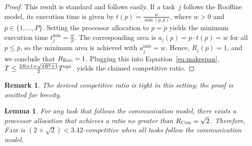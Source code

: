 \documentclass{article}
\newtheorem{lemma}{Lemma}
\newtheorem{remark}{Remark}
\newcommand\fair{\textsc{Fair}\xspace}
\newcommand\ratio{R\xspace}
\newcommand\opt{\textnormal{opt}\xspace}
\newcommand\ROO{\textsc{Roo}\xspace}
\newcommand\COM{\textsc{Com}\xspace}
\begin{document}
\begin{proof}
This result is standard and follows easily.  
If a task~$j$ follows the Roofline model, its execution time is given by $t(p) = \frac{w}{\min(p, \bar{p})}$, where $w > 0$ and $\bar{p} \in \{1, \dots, P\}$.  
Setting the processor allocation to $p = \bar{p}$ yields the minimum execution time $t_j^{\min} = \frac{w}{\bar{p}}$.  
The corresponding area is $a_j(p) = p \cdot t(p) = w$ for all $p \le \bar{p}$, so the minimum area is achieved with $a_j^{\min} = w$.  
Hence, $\ratio_j(p) = 1$, and we conclude that $\ratio_{\ROO} = 1$.  
Plugging this into Equation~\eqref{eq.makespan}, $T \leq \frac{2\ratio+1+
\sqrt{4\ratio^2+1}}{2} T^{\opt}$. yields the claimed competitive ratio.
\end{proof}

\begin{remark}
The derived competitive ratio is tight in this setting; the proof is omitted for brevity.
\end{remark}

\begin{lemma}\label{lem.comm}
For any task that follows the communication model, there exists a processor allocation that achieves a ratio no greater than  $\ratio_{\COM} = \sqrt{2}$.  
Therefore, \fair is $(2 + \sqrt{2}) < 3.42$-competitive when all tasks follow the communication model.
\end{lemma}
\end{document}
